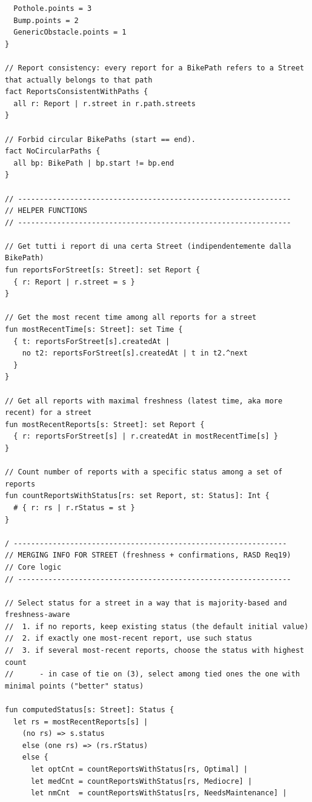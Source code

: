 \documentclass{Configuration_Files/PoliMi3i_thesis}
\begin{document}
\begin{verbatim}
  Pothole.points = 3
  Bump.points = 2
  GenericObstacle.points = 1
}

// Report consistency: every report for a BikePath refers to a Street that actually belongs to that path
fact ReportsConsistentWithPaths {
  all r: Report | r.street in r.path.streets
}

// Forbid circular BikePaths (start == end).
fact NoCircularPaths {
  all bp: BikePath | bp.start != bp.end
}

// ---------------------------------------------------------------
// HELPER FUNCTIONS
// ---------------------------------------------------------------

// Get tutti i report di una certa Street (indipendentemente dalla BikePath)
fun reportsForStreet[s: Street]: set Report {
  { r: Report | r.street = s }
}

// Get the most recent time among all reports for a street
fun mostRecentTime[s: Street]: set Time {
  { t: reportsForStreet[s].createdAt |
    no t2: reportsForStreet[s].createdAt | t in t2.^next
  }
}

// Get all reports with maximal freshness (latest time, aka more recent) for a street
fun mostRecentReports[s: Street]: set Report {
  { r: reportsForStreet[s] | r.createdAt in mostRecentTime[s] }
}

// Count number of reports with a specific status among a set of reports
fun countReportsWithStatus[rs: set Report, st: Status]: Int {
  # { r: rs | r.rStatus = st }
}

/ ---------------------------------------------------------------
// MERGING INFO FOR STREET (freshness + confirmations, RASD Req19)
// Core logic 
// ---------------------------------------------------------------

// Select status for a street in a way that is majority-based and freshness-aware
//  1. if no reports, keep existing status (the default initial value)
//  2. if exactly one most-recent report, use such status
//  3. if several most-recent reports, choose the status with highest count
//      - in case of tie on (3), select among tied ones the one with minimal points ("better" status)

fun computedStatus[s: Street]: Status {
  let rs = mostRecentReports[s] |
    (no rs) => s.status
    else (one rs) => (rs.rStatus)
    else {
      let optCnt = countReportsWithStatus[rs, Optimal] |
      let medCnt = countReportsWithStatus[rs, Mediocre] |
      let nmCnt  = countReportsWithStatus[rs, NeedsMaintenance] |


\end{verbatim}
\end{document}
